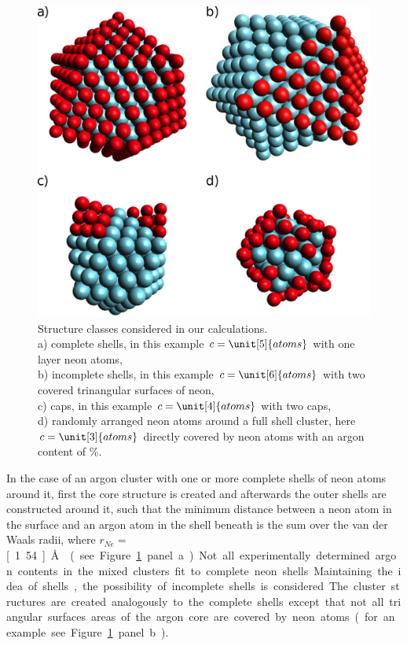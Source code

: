 \begin{figure}[h!]
 \centering
 \includegraphics[scale=0.9]{pics/NeAr_structures1.eps}
 \caption{Structure classes considered in our calculations.\\
          a) complete shells, in this example $c=\unit[5]{atoms}$ with one layer
          neon atoms,\\
          b) incomplete shells, in this example
          $c=\unit[6]{atoms}$ with two covered trinangular surfaces
          of neon,\\
          c) caps, in this example $c=\unit[4]{atoms}$ with two caps,\\
          d) randomly arranged neon atoms around a full shell cluster,
          here $c=\unit[3]{atoms}$ directly covered by neon atoms
          with an argon content of \unit[47]{\%}.}
 \label{figure:structures}
\end{figure}

In the case of an argon cluster with one or more complete shells of neon
atoms around it, first the core structure is created and afterwards the
outer shells are constructed around it, such that the minimum distance between a
neon atom in the surface and an argon atom in the shell beneath is the sum
over the van der Waals radii, where $r_{Ne}=$\unit[1.54]{\AA} \cite{Bondi64}
(see Figure \ref{figure:structures} panel a).

Not all experimentally determined argon contents in the mixed clusters
fit to complete neon shells. Maintaining the idea of shells,
the possibility of incomplete shells is considered.
The cluster structures are created analogously to the
complete shells except that not all triangular surfaces areas of the argon core
are covered by neon atoms (for an example see Figure \ref{figure:structures}
panel b).

